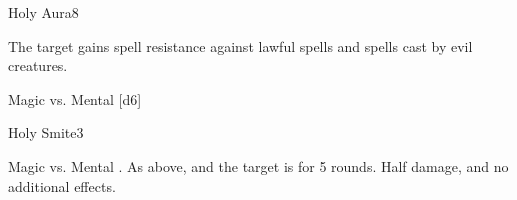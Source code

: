 \begin{spellsection}{Holy Aura}{8}
    \begin{spellheader}
    \end{spellheader}
    \begin{spellcontent}
        \begin{spelltargetinginfo}
        \end{spelltargetinginfo}
        \begin{spelleffects}
            \spelleffect The target gains spell resistance against lawful spells and spells cast by evil creatures.
            \spelldur \durshort \dismissable
        \end{spelleffects}
    \end{spellcontent}
    \begin{spellsubcontent}
        \begin{spelltargetinginfo}
        \end{spelltargetinginfo}
        \begin{spelleffects}
            \begin{spellattack}{Magic vs. Mental}
                \spellsuccess {}[d6]
            \end{spellattack}
        \end{spelleffects}
    \end{spellsubcontent}
    \begin{spellfooter}
        \miscastexplode
    \end{spellfooter}
\end{spellsection}

\begin{spellsection}{Holy Smite}{3}
    \begin{spellheader}
    \end{spellheader}
    \begin{spellcontent}
        \begin{spelltargetinginfo}
        \end{spelltargetinginfo}
        \begin{spelleffects}
            \begin{spellattack}{Magic vs. Mental}
                \spellsuccess {}.
                \spellcritical As above, and the target is \dazed for 5 rounds.
                \spellfailure Half damage, and no additional effects.
            \end{spellattack}
        \end{spelleffects}
    \end{spellcontent}
    \begin{spellfooter}
        \miscastrandom
    \end{spellfooter}
\end{spellsection}

